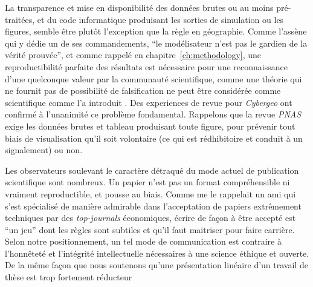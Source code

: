 La transparence et mise en disponibilité des données brutes ou au moins pré-traitées, et du code informatique produisant les sorties de simulation ou les figures, semble être plutôt l'exception que la règle en géographie. Comme l'assène  qui y dédie un de ses commandements, ``le modélisateur n'est pas le gardien de la vérité prouvée'', et comme rappelé en chapitre~\ref{ch:methodology}, une reproductibilité parfaite des résultats est nécessaire pour une reconnaissance d'une quelconque valeur par la communauté scientifique, comme une théorie qui ne fournit pas de possibilité de falsification ne peut être considérée comme scientifique comme l'a introduit . Des experiences de revue pour \emph{Cybergeo} ont confirmé à l'unanimité ce problème fondamental. Rappelons que la revue \emph{PNAS} exige les données brutes et tableau produisant toute figure, pour prévenir tout biais de visualisation qu'il soit volontaire (ce qui est rédhibitoire et conduit à un signalement) ou non.



Les observateurs soulevant le caractère détraqué du mode actuel de publication scientifique sont nombreux. Un papier n'est pas un format compréhensible ni vraiment reproductible, et pousse au biais. Comme me le rappelait un ami qui s'est spécialisé de manière admirable dans l'acceptation de papiers extrêmement techniques par des \emph{top-journals} économiques, écrire de façon à être accepté est ``un jeu'' dont les règles sont subtiles et qu'il faut maitriser pour faire carrière. Selon notre positionnement, un tel mode de communication est contraire à l'honnêteté et l'intégrité intellectuelle nécessaires à une science éthique et ouverte. De la même façon que nous soutenons qu'une présentation linéaire d'un travail de thèse est trop fortement réducteur
















